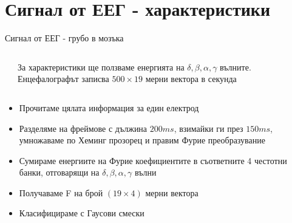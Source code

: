 \documentclass[9pt]{beamer}
\begin{document}
    \section{Сигнал от ЕЕГ - характеристики}
    \begin{frame}[t]{Сигнал от ЕЕГ - грубо в мозъка}
        \begin{columns}
            \begin{column}{0.48\textwidth}
            \end{column}
            \begin{column}{0.48\textwidth}
                \pause
                За характеристики ще ползваме енергията на  $\delta, \beta, \alpha, \gamma$ вълните.
                \pause
                Енцефалографът записва $500\times19$ мерни вектора в секунда
            \end{column}
        \end{columns}
        \begin{itemize}
            \setlength\itemsep{\fill}
            \pause
            \item Прочитаме цялата информация за един електрод
            \pause
            \item Разделяме на фреймове с дължина $200ms$, взимайки ги през $150ms$, умножаваме по Хеминг прозорец и правим Фурие преобразувание
            \pause
            \item Сумираме енергиите на Фурие коефициентите в съответните 4 честотни банки, отговарящи на $\delta, \beta, \alpha, \gamma$ вълни
            \pause
            \item Получаваме F на брой $(19\times 4)$ мерни вектора
            \pause
            \item Класифицираме с Гаусови смески
        \end{itemize}
    \end{frame}
\end{document}
